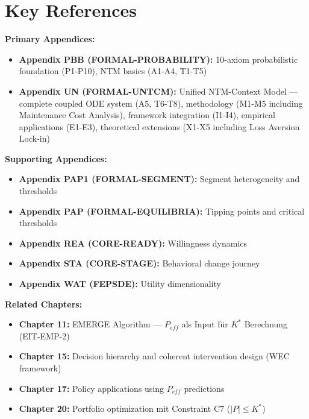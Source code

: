 \section{Key References}

\textbf{Primary Appendices:}
\begin{itemize}[nosep]
    \item \textbf{Appendix PBB (FORMAL-PROBABILITY):} 10-axiom probabilistic foundation (P1-P10), NTM basics (A1-A4, T1-T5)
    \item \textbf{Appendix UN (FORMAL-UNTCM):} Unified NTM-Context Model --- complete coupled ODE system (A5, T6-T8), methodology (M1-M5 including Maintenance Cost Analysis), framework integration (I1-I4), empirical applications (E1-E3), theoretical extensions (X1-X5 including Loss Aversion Lock-in)
\end{itemize}

\textbf{Supporting Appendices:}
\begin{itemize}[nosep]
    \item \textbf{Appendix PAP1 (FORMAL-SEGMENT):} Segment heterogeneity and thresholds
    \item \textbf{Appendix PAP (FORMAL-EQUILIBRIA):} Tipping points and critical thresholds
    \item \textbf{Appendix REA (CORE-READY):} Willingness dynamics
    \item \textbf{Appendix STA (CORE-STAGE):} Behavioral change journey
    \item \textbf{Appendix WAT (FEPSDE):} Utility dimensionality
\end{itemize}

\textbf{Related Chapters:}
\begin{itemize}[nosep]
    \item \textbf{Chapter 11:} EMERGE Algorithm — $P_{eff}$ als Input für $K^*$ Berechnung (EIT-EMP-2)
    \item \textbf{Chapter 15:} Decision hierarchy and coherent intervention design (WEC framework)
    \item \textbf{Chapter 17:} Policy applications using $P_{eff}$ predictions
    \item \textbf{Chapter 20:} Portfolio optimization mit Constraint C7 ($|P| \leq K^*$)
\end{itemize}

